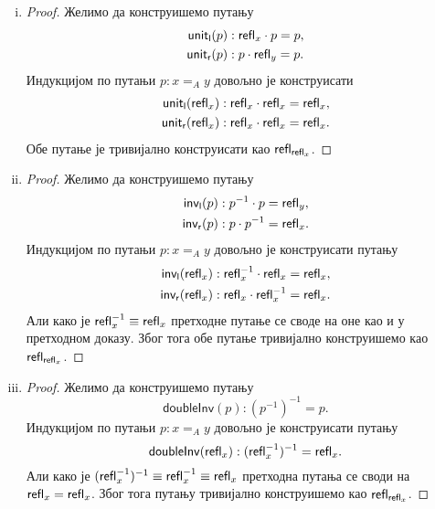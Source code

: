 \documentclass[12pt,oneside]{memoir}
\begin{document}
\begin{enumerate}[(i)]
    \item 
    \begin{proof}
        Желимо да конструишемо путању
        \begin{align*}
            \mathsf{unit_l}(p) &: \mathsf{refl}_{x} \cdot p = p, \\
            \mathsf{unit_r}(p) &: p \cdot \mathsf{refl}_{y} = p. \\
        \end{align*} 
        Индукцијом по путањи $p : x =_A y$ довољно је конструисати
        \begin{align*}
            \mathsf{unit_l}(\mathsf{refl}_{x}) &: \mathsf{refl}_{x} \cdot \mathsf{refl}_{x} = \mathsf{refl}_{x}, \\
            \mathsf{unit_r}(\mathsf{refl}_{x}) &: \mathsf{refl}_{x} \cdot \mathsf{refl}_{x} = \mathsf{refl}_{x}.
        \end{align*} 
        Обе путање је тривијално конструисати као $\mathsf{refl}_{\mathsf{refl}_{x}}$.
    \end{proof}
    \item 
    \begin{proof}
        Желимо да конструишемо путању
        \begin{align*}
            \mathsf{inv_l}(p) &: p^{-1} \cdot p = \mathsf{refl}_{y}, \\
            \mathsf{inv_r}(p) &: p \cdot p^{-1} = \mathsf{refl}_{x}.
        \end{align*}
        Индукцијом по путањи $p : x =_A y$ довољно је конструисати путању
        \begin{align*}
            \mathsf{inv_l}(\mathsf{refl}_{x}) &: \mathsf{refl}_{x}^{-1} \cdot \mathsf{refl}_{x} = \mathsf{refl}_{x}, \\
            \mathsf{inv_r}(\mathsf{refl}_{x}) &: \mathsf{refl}_{x} \cdot \mathsf{refl}_{x}^{-1} = \mathsf{refl}_{x}.
        \end{align*}
        Али како је $\mathsf{refl}_{x}^{-1} \equiv \mathsf{refl}_{x}$ претходне путање се своде на оне као и у претходном доказу. Због тога обе путање тривијално конструишемо као $\mathsf{refl}_{\mathsf{refl}_{x}}$.
    \end{proof}
    \item
    \begin{proof}
        Желимо да конструишемо путању
        \[ \mathsf{doubleInv} (p) : (p^{-1})^{-1} = p. \]
        Индукцијом по путањи $p : x =_A y$ довољно је конструисати путању
        \[ \mathsf{doubleInv} (\mathsf{refl}_{x}) : (\mathsf{refl}_{x}^{-1})^{-1} = \mathsf{refl}_{x}. \]
        Али како је $(\mathsf{refl}_{x}^{-1})^{-1} \equiv \mathsf{refl}_{x}^{-1} \equiv \mathsf{refl}_{x}$ претходна путања се своди на $\mathsf{refl}_{x} = \mathsf{refl}_{x}$. Због тога путању тривијално конструишемо као $\mathsf{refl}_{\mathsf{refl}_{x}}$. 

\end{proof}
\end{enumerate}
\end{document}
